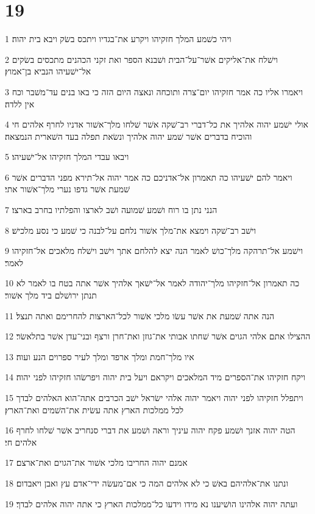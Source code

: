 \chapter{19}

\par 1 ויהי כשׁמע המלך חזקיהו ויקרע את־בגדיו ויתכס בשׂק ויבא בית יהוה׃
\par 2 וישׁלח את־אליקים אשׁר־על־הבית ושׁבנא הספר ואת זקני הכהנים מתכסים בשׂקים אל־ישׁעיהו הנביא בן־אמוץ׃
\par 3 ויאמרו אליו כה אמר חזקיהו יום־צרה ותוכחה ונאצה היום הזה כי באו בנים עד־משׁבר וכח אין ללדה׃
\par 4 אולי ישׁמע יהוה אלהיך את כל־דברי רב־שׁקה אשׁר שׁלחו מלך־אשׁור אדניו לחרף אלהים חי והוכיח בדברים אשׁר שׁמע יהוה אלהיך ונשׂאת תפלה בעד השׁארית הנמצאה׃
\par 5 ויבאו עבדי המלך חזקיהו אל־ישׁעיהו׃
\par 6 ויאמר להם ישׁעיהו כה תאמרון אל־אדניכם כה אמר יהוה אל־תירא מפני הדברים אשׁר שׁמעת אשׁר גדפו נערי מלך־אשׁור אתי׃
\par 7 הנני נתן בו רוח ושׁמע שׁמועה ושׁב לארצו והפלתיו בחרב בארצו׃
\par 8 וישׁב רב־שׁקה וימצא את־מלך אשׁור נלחם על־לבנה כי שׁמע כי נסע מלכישׁ׃
\par 9 וישׁמע אל־תרהקה מלך־כושׁ לאמר הנה יצא להלחם אתך וישׁב וישׁלח מלאכים אל־חזקיהו לאמר׃
\par 10 כה תאמרון אל־חזקיהו מלך־יהודה לאמר אל־ישׁאך אלהיך אשׁר אתה בטח בו לאמר לא תנתן ירושׁלם ביד מלך אשׁור׃
\par 11 הנה אתה שׁמעת את אשׁר עשׂו מלכי אשׁור לכל־הארצות להחרימם ואתה תנצל׃
\par 12 ההצילו אתם אלהי הגוים אשׁר שׁחתו אבותי את־גוזן ואת־חרן ורצף ובני־עדן אשׁר בתלאשׂר׃
\par 13 איו מלך־חמת ומלך ארפד ומלך לעיר ספרוים הנע ועוה׃
\par 14 ויקח חזקיהו את־הספרים מיד המלאכים ויקראם ויעל בית יהוה ויפרשׂהו חזקיהו לפני יהוה׃
\par 15 ויתפלל חזקיהו לפני יהוה ויאמר יהוה אלהי ישׂראל ישׁב הכרבים אתה־הוא האלהים לבדך לכל ממלכות הארץ אתה עשׂית את־השׁמים ואת־הארץ׃
\par 16 הטה יהוה אזנך ושׁמע פקח יהוה עיניך וראה ושׁמע את דברי סנחריב אשׁר שׁלחו לחרף אלהים חי׃
\par 17 אמנם יהוה החריבו מלכי אשׁור את־הגוים ואת־ארצם׃
\par 18 ונתנו את־אלהיהם באשׁ כי לא אלהים המה כי אם־מעשׂה ידי־אדם עץ ואבן ויאבדום׃
\par 19 ועתה יהוה אלהינו הושׁיענו נא מידו וידעו כל־ממלכות הארץ כי אתה יהוה אלהים לבדך׃
